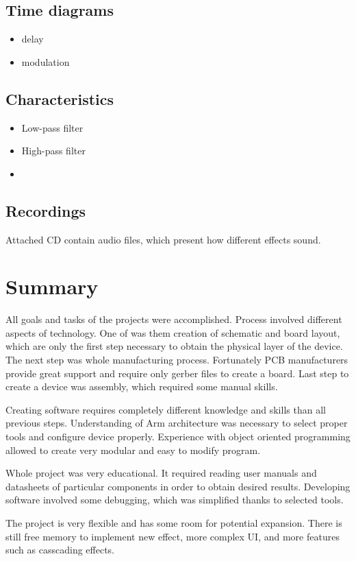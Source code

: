 \documentclass[a4paper,twoside,12pt]{book}
\begin{document}
\section{Time diagrams}
\begin{itemize}
    \item delay
    \item modulation
\end{itemize}

\section{Characteristics}
\begin{itemize}
    \item Low-pass filter
    \item High-pass filter
    \item 
\end{itemize}

\section{Recordings}
Attached CD contain audio files,
which present how different effects sound.

\chapter{Summary}\label{ch:summary}
All goals and tasks of the projects were accomplished.
Process involved different aspects of technology.
One of was them creation of schematic and board layout,
which are only the first step necessary to obtain 
the physical layer of the device.
The next step was whole manufacturing process.
Fortunately PCB manufacturers provide great support
and require only gerber files to create a board.
Last step to create a device was assembly,
which required some manual skills.

Creating software requires completely different
knowledge and skills than all previous steps.
Understanding of Arm architecture was necessary
to select proper tools and configure device properly.
Experience with object oriented programming
allowed to create very modular and easy to modify program.

Whole project was very educational.
It required reading user manuals and datasheets of particular components
in order to obtain desired results.
Developing software involved some debugging,
which was simplified thanks to selected tools.

The project is very flexible and has some room for potential expansion.
There is still free memory to implement new effect, more complex UI,
and more features such as casscading effects.
\end{document}
